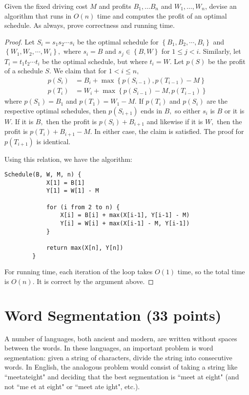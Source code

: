 \documentclass{article}
\begin{document}
Given the fixed driving cost $M$ and profits $B_1, \dots B_n$ and $W_1, \dots, W_n$, devise an algorithm that runs in $O(n)$ time and computes the profit of an optimal schedule.  As always, prove correctness and running time.  
\begin{proof}
	Let $S_i=s_1s_2\cdots s_i$ be the optimal schedule for $\left\{ B_1, B_2, \cdots, B_i \right\}$ and $\left\{ W_1, W_2, \cdots, W_i \right\},$ where $s_i=B$ and $s_j\in\left\{ B, W \right\}$ for $1\le j<i.$ Similarly, let $T_i=t_1t_2\cdots t_i$ be the optimal schedule, but where $t_i=W.$ Let $p(S)$ be the profit of a schedule $S.$ We claim that for $1<i\le n,$
	\begin{align*}
		p(S_i) &= B_i + \max\left\{ p(S_{i-1}), p(T_{i-1})- M \right\} \\
		p(T_i) &= W_i + \max\left\{ p(S_{i-1}) - M, p(T_{i-1}) \right\}
	\end{align*}
	where $p(S_1)=B_1$ and $p(T_1)=W_1-M.$ If $p(T_i)$ and $p(S_i)$ are the respective optimal schedules, then $p(S_{i+1})$ ends in $B,$ so either $s_i$ is $B$ or it is $W.$ If it is $B,$ then the profit is $p(S_i)+B_{i+1}$ and likewise if it is $W,$ then the profit is $p(T_i)+B_{i+1}-M.$ In either case, the claim is satisfied. The proof for $p(T_{i+1})$ is identical. 

	Using this relation, we have the algorithm:
	\begin{Verbatim}[tabsize=4]
		Schedule(B, W, M, n) {
			X[1] = B[1]
			Y[1] = W[1] - M

			for (i from 2 to n) {
				X[i] = B[i] + max(X[i-1], Y[i-1] - M)
				Y[i] = W[i] + max(X[i-1] - M, Y[i-1])
			}

			return max(X[n], Y[n])
		}
	\end{Verbatim}

	For running time, each iteration of the loop takes $O(1)$ time, so the total time is $O(n).$ It is correct by the argument above.
\end{proof}

\newpage
\section{Word Segmentation (33 points)}
A number of languages, both ancient and modern, are written without spaces between the words.  In these languages, an important problem is word segmentation: given a string of characters, divide the string into consecutive words.  In English, the analogous problem would consist of taking a string like ``meetateight" and deciding that the best segmentation is ``meet at eight" (and not ``me et at eight" or ``meet ate ight", etc.).  
\end{document}
